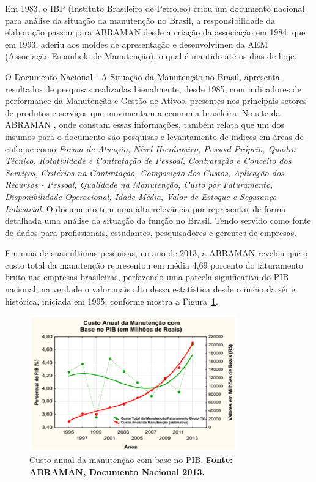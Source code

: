 Em 1983, o IBP (Instituto Brasileiro de Petróleo) criou um documento nacional para análise da situação da manutenção no Brasil, a responsibilidade da elaboração passou para ABRAMAN desde a criação da associação em 1984, que em 1993, aderiu aos moldes de apresentação e desenvolvimen da AEM (Associação Espanhola de Manutenção), o qual é mantido até os dias de hoje.  

O Documento Nacional - A Situação da Manutenção no Brasil, apresenta resultados de pesquisas realizadas bienalmente, desde 1985, com indicadores de performance da Manutenção e Gestão de Ativos, presentes nos principais setores de produtos e serviços que movimentam a economia brasileira. No site da ABRAMAN \cite{abraman}, onde constam essas informações, também relata que um dos insumos para o documento são pesquisas e levantamento de índices em áreas de enfoque como \emph{Forma de Atuação, Nível Hierárquico, Pessoal Próprio, Quadro Técnico, Rotatividade e Contratação de Pessoal, Contratação e Conceito dos Serviços, Critérios na Contratação, Composição dos Custos, Aplicação dos Recursos - Pessoal, Qualidade na Manutenção, Custo por Faturamento, Disponibilidade Operacional, Idade Média, Valor de Estoque e Segurança Industrial}. O documento tem uma alta relevância por representar de forma detalhada uma análise da situação da função no Brasil. Tendo servido como fonte de dados para profissionais, estudantes, pesquisadores e gerentes de empresas.

Em uma de suas últimas pesquisas, no ano de 2013, a ABRAMAN revelou que o custo total da manutenção representou em média 4,69 porcento do faturamento bruto nas empresas brasileiras, perfazendo uma parcela significativa do PIB nacional, na verdade o valor mais alto dessa estatística desde o inicio da série histórica, iniciada em 1995, conforme mostra a Figura~\ref{custo_anual_2013}.

\graphicspath{{figuras/}}
\begin{figure}[H]
\centering
\includegraphics[width=0.8\textwidth]{dados_pib_pesquisa_intro.eps}
\caption{Custo anual da manutenção com base no PIB. \textbf{Fonte: ABRAMAN, Documento Nacional 2013.}}
\label{custo_anual_2013}
\end{figure}


